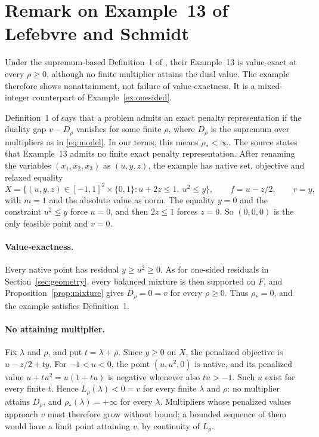 \section{Remark on Example~13 of Lefebvre and Schmidt}\label{app:attainment}
Under the supremum-based Definition~1 of \citet{LefebvreSchmidt2025},
their Example~13 is value-exact at every $\rho\ge0$, although no finite
multiplier attains the dual value. The example therefore shows
nonattainment, not failure of value-exactness. It is a mixed-integer
counterpart of Example~\ref{ex:onesided}.

Definition~1 of \citet{LefebvreSchmidt2025} says that a problem admits
an exact penalty representation if the duality gap $v-D_\rho$ vanishes
for some finite $\rho$, where $D_\rho$ is the supremum over multipliers
as in \eqref{eq:model}. In our terms, this means $\rho_*<\infty$. The
source states that Example~13 admits no finite exact penalty
representation. After renaming the variables $(x_1,x_2,x_3)$ as
$(u,y,z)$, the example has native set, objective and relaxed equality
\[
 X=\{(u,y,z)\in[-1,1]^2\times\{0,1\}:u+2z\le1,\ u^2\le y\},
 \qquad f=u-z/2,\qquad r=y,
\]
with $m=1$ and the absolute value as norm. The equality $y=0$ and the
constraint $u^2\le y$ force $u=0$, and then $2z\le1$ forces $z=0$. So
$(0,0,0)$ is the only feasible point and $v=0$.

\paragraph{Value-exactness.}
Every native point has residual $y\ge u^2\ge0$. As for one-sided
residuals in Section~\ref{sec:geometry}, every balanced mixture is then
supported on $F$, and Proposition~\ref{prop:mixture} gives $D_\rho=0=v$
for every $\rho\ge0$. Thus $\rho_*=0$, and the example satisfies
Definition~1.

\paragraph{No attaining multiplier.}
Fix $\lambda$ and $\rho$, and put $t=\lambda+\rho$. Since $y\ge0$ on
$X$, the penalized objective is $u-z/2+ty$. For $-1<u<0$, the point
$(u,u^2,0)$ is native, and its penalized value $u+tu^2=u(1+tu)$ is
negative whenever also $tu>-1$. Such $u$ exist for every finite $t$.
Hence $L_\rho(\lambda)<0=v$ for every finite $\lambda$ and $\rho$: no
multiplier attains $D_\rho$, and $\rho_*(\lambda)=+\infty$ for every
$\lambda$. Multipliers whose penalized values approach $v$ must
therefore grow without bound; a bounded sequence of them would have a
limit point attaining $v$, by continuity of $L_\rho$.


